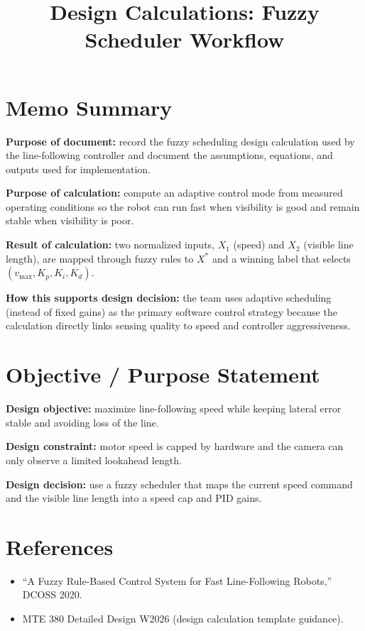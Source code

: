 \documentclass{article}
\begin{document}
\title{Design Calculations: Fuzzy Scheduler Workflow}
\author{}
\date{}
\maketitle

\section{Memo Summary}
\noindent\textbf{Purpose of document:} record the fuzzy scheduling design calculation used by the line-following controller and document the assumptions, equations, and outputs used for implementation.
\vspace{\baselineskip}

\noindent\textbf{Purpose of calculation:} compute an adaptive control mode from measured operating conditions so the robot can run fast when visibility is good and remain stable when visibility is poor.
\vspace{\baselineskip}

\noindent\textbf{Result of calculation:} two normalized inputs, $X_1$ (speed) and $X_2$ (visible line length), are mapped through fuzzy rules to $X^*$ and a winning label that selects $(v_{\max}, K_p, K_i, K_d)$.
\vspace{\baselineskip}

\noindent\textbf{How this supports design decision:} the team uses adaptive scheduling (instead of fixed gains) as the primary software control strategy because the calculation directly links sensing quality to speed and controller aggressiveness.

\section{Objective / Purpose Statement}
\noindent\textbf{Design objective:} maximize line-following speed while keeping lateral error stable and avoiding loss of the line.
\vspace{\baselineskip}

\noindent\textbf{Design constraint:} motor speed is capped by hardware and the camera can only observe a limited lookahead length.
\vspace{\baselineskip}

\noindent\textbf{Design decision:} use a fuzzy scheduler that maps the current speed command and the visible line length into a speed cap and PID gains.

\section{References}
\begin{itemize}
\item ``A Fuzzy Rule-Based Control System for Fast Line-Following Robots,'' DCOSS 2020.
\item MTE 380 Detailed Design W2026 (design calculation template guidance).
\end{itemize}
\end{document}

